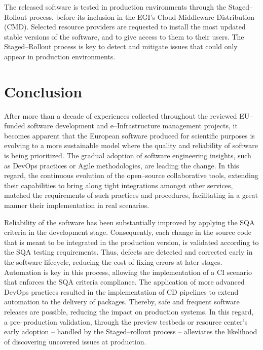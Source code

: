\documentclass[journal]{IEEEtran}
\begin{document}
The released software is tested in production environments through the
Staged--Rollout process, before its inclusion in the EGI's Cloud Middleware Distribution (CMD).
Selected resource providers are requested to install
the most updated stable versions of the software, and to give access to them to their users. The
Staged--Rollout process is key to detect and mitigate issues that could only
appear in production environments.

\section{Conclusion}
\label{sec:con}

After more than a decade of experiences collected throughout the reviewed
EU--funded software development and e--Infrastructure management projects, it
becomes apparent that the European software produced for scientific purposes is
evolving to a more sustainable model where the quality and reliability of
software is being prioritized. The gradual adoption of software engineering insights, such as
DevOps practices or Agile methodologies, are leading the change. In this regard, the continuous evolution of the open--source
collaborative tools, extending their capabilities to bring along tight
integrations amongst other services, matched the requirements of such practices
and procedures, facilitating in a great manner their implementation in real scenarios.

Reliability of the software has been substantially improved by applying the SQA
criteria in the development stage. Consequently, each change in the source code
that is meant to be integrated in the production version, is validated according
to the SQA testing requirements. Thus, defects are detected and corrected early in the
software lifecycle, reducing the cost of fixing errors at later stages. Automation is
key in this process, allowing the implementation of a CI scenario that enforces
the SQA criteria compliance. The application of more advanced DevOps practices
resulted in the implementation of CD pipelines to extend automation to the
delivery of packages. Thereby, safe and frequent software releases are possible, reducing
the impact on production systems. In this regard, a pre--production validation,
through the preview testbeds or resource center's early adoption -- handled by the
Staged--rollout process -- alleviates the likelihood of discovering uncovered
issues at production.
\end{document}

